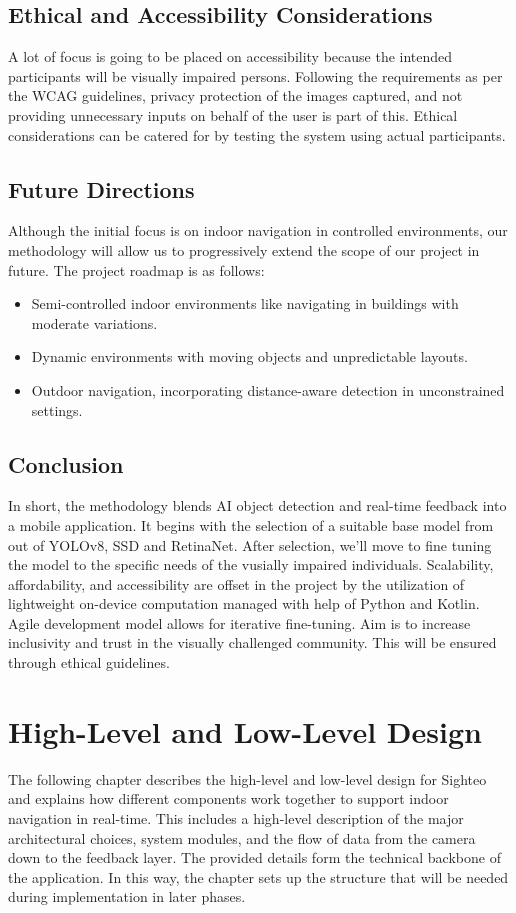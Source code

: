 \documentclass{FastFyp}
\begin{document}
\section{Ethical and Accessibility Considerations}
A lot of focus is going to be placed on accessibility because the intended participants will be visually impaired persons. Following the requirements as per the WCAG guidelines, privacy protection of the images captured, and not providing unnecessary inputs on behalf of the user is part of this. Ethical considerations can be catered for by testing the system using actual participants.

\section{Future Directions}
Although the initial focus is on indoor navigation in controlled environments, our methodology will allow us to progressively extend the scope of our project in future. The project roadmap is as follows:
\begin{itemize}
    \item Semi-controlled indoor environments like navigating in buildings with moderate variations.
    \item Dynamic environments with moving objects and unpredictable layouts.  
    \item Outdoor navigation, incorporating distance-aware detection in unconstrained settings. 
\end{itemize}

\section{Conclusion}
In short, the methodology blends AI object detection and real-time feedback into a mobile application. It begins with the selection of a suitable base model from out of YOLOv8, SSD and RetinaNet. After selection, we'll move to fine tuning the model to the specific needs of the vusially impaired individuals. Scalability, affordability, and accessibility are offset in the project by the utilization of lightweight on-device computation managed with help of Python and Kotlin. Agile development model allows for iterative fine-tuning. Aim is to increase inclusivity and trust in the visually challenged community. This will be ensured through ethical guidelines.


\chapter{High-Level and Low-Level Design}
The following chapter describes the high-level and low-level design for Sighteo and explains how different components work together to support indoor navigation in real-time. This includes a high-level description of the major architectural choices, system modules, and the flow of data from the camera down to the feedback layer. The provided details form the technical backbone of the application. In this way, the chapter sets up the structure that will be needed during implementation in later phases.
\end{document}
